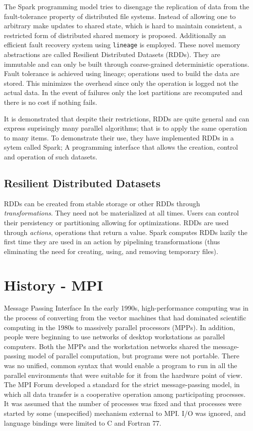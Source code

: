 \documentclass[letterpaper,twocolumn,10pt]{article}
\begin{document}
The Spark programming model tries to disengage the replication of data from the fault-tolerance property of distributed file systems. Instead of allowing one to arbitrary make updates to shared state, which is hard to maintain consistent, a restricted form of distributed shared memory is proposed. Additionally an efficient fault recovery system using {\tt lineage} is employed. These novel memory abstractions are called Resilient Distributed Datasets (RDDs). They are immutable and can only be built through coarse-grained deterministic operations. Fault tolerance is achieved using lineage; operations used to build the data are stored. This minimizes the overhead since only the operation is logged not the actual data. In the event of failures only the lost partitions are recomputed and there is no cost if nothing fails.

It is demonstrated that despite their restrictions, RDDs are quite general and can express suprisingly many parallel algorithms; that is to apply the same operation to many items. To demonstrate their use, they have implemented RDDs in a sytem called Spark; A programming interface that allows the creation, control and operation of such datasets.

\subsection{Resilient Distributed Datasets}
RDDs can be created from stable storage or other RDDs through \textit{transformations}. They need not be materialized at all times. Users can control their persistency or partitioning allowing for optimizations. RDDs are used through \textit{actions}, operations that return a value. Spark computes RDDs lazily the first time they are used in an action by pipelining transformations (thus eliminating the need for creating, using, and removing temporary files).




\section{History - MPI}
Message Passing Interface
In the early 1990s, high-performance computing was in the process of converting from the vector machines that had dominated scientific computing in the 1980s to massively parallel processors (MPPs).
In addition, people were beginning to use networks of desktop workstations as parallel computers. Both the MPPs and the workstation networks shared the message-passing model of parallel computation, but programs were not portable.
There was no unified, common syntax that would enable a program to run in all the parallel environments that were suitable for it from the hardware point of view.
The MPI Forum developed a standard for the strict message-passing model, in which all data transfer is a cooperative operation among participating processes. It was assumed that the number of processes was fixed and that processes were started by some (unspecified) mechanism external to MPI.
I/O was ignored, and language bindings were limited to C and Fortran 77.
\end{document}
